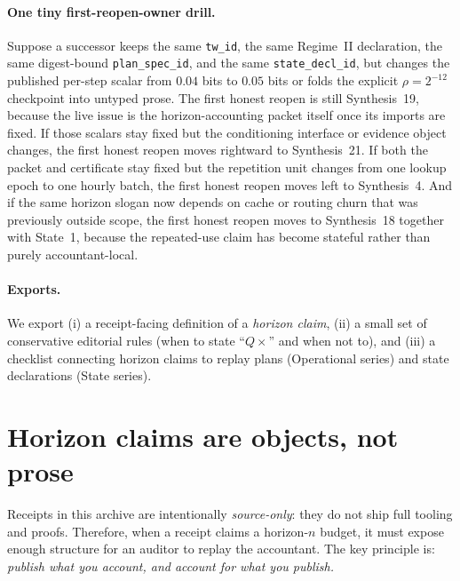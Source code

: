 \documentclass[11pt]{article}
\begin{document}
\paragraph{One tiny first-reopen-owner drill.}
Suppose a successor keeps the same \texttt{tw\_id}, the same Regime~II declaration, the same digest-bound \texttt{plan\_spec\_id}, and the same \texttt{state\_decl\_id}, but changes the published per-step scalar from $0.04$ bits to $0.05$ bits or folds the explicit $\rho=2^{-12}$ checkpoint into untyped prose. The first honest reopen is still Synthesis~19, because the live issue is the horizon-accounting packet itself once its imports are fixed. If those scalars stay fixed but the conditioning interface or evidence object changes, the first honest reopen moves rightward to Synthesis~21. If both the packet and certificate stay fixed but the repetition unit changes from one lookup epoch to one hourly batch, the first honest reopen moves left to Synthesis~4. And if the same horizon slogan now depends on cache or routing churn that was previously outside scope, the first honest reopen moves to Synthesis~18 together with State~1, because the repeated-use claim has become stateful rather than purely accountant-local.\cite{series:threatwindows,series:receiptitems,series:planstateequiv,series:condcert,series:operationalA,series:operationalB,series:state1,series:oddsinflation}

\paragraph{Exports.}
We export (i) a receipt-facing definition of a \emph{horizon claim}, (ii) a small set of conservative editorial rules (when to state ``$Q\times$'' and when not to), and (iii) a checklist connecting horizon claims to replay plans (Operational series) and state declarations (State series).

\section{Horizon claims are objects, not prose}
Receipts in this archive are intentionally \emph{source-only}: they do not ship full tooling and proofs.
Therefore, when a receipt claims a horizon-$n$ budget, it must expose enough structure for an auditor to replay the accountant.
The key principle is: \emph{publish what you account, and account for what you publish.}
\end{document}
